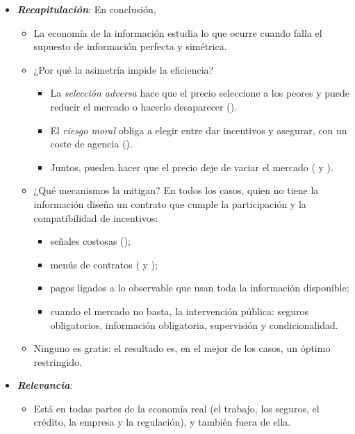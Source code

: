 \documentclass[11pt]{article}
\begin{document}
\begin{itemize}
\item \textbf{\emph{Recapitulación}}: En conclusión,
  \begin{itemize}
  \item La economía de la información estudia lo que ocurre cuando falla el supuesto de información perfecta y simétrica.
  \item ¿Por qué la asimetría impide la eficiencia?
    \begin{itemize}
    \item La \emph{selección adversa} hace que el precio seleccione a los peores y puede reducir el mercado o hacerlo desaparecer ().
    \item El \emph{riesgo moral} obliga a elegir entre dar incentivos y asegurar, con un coste de agencia ().
    \item Juntos, pueden hacer que el precio deje de vaciar el mercado ( y ).
    \end{itemize}
  \item ¿Qué mecanismos la mitigan? En todos los casos, quien no tiene la información diseña un contrato que cumple la participación y la compatibilidad de incentivos:
    \begin{itemize}
    \item señales costosas ();
    \item menús de contratos ( y );
    \item pagos ligados a lo observable que usan toda la información disponible;
    \item cuando el mercado no basta, la intervención pública: seguros obligatorios, información obligatoria, supervisión y condicionalidad.
    \end{itemize}
  \item Ninguno es gratis: el resultado es, en el mejor de los casos, un óptimo restringido.
  \end{itemize}
\item \textbf{\emph{Relevancia}}:
  \begin{itemize}
  \item Está en todas partes de la economía real (el trabajo, los seguros, el crédito, la empresa y la regulación), y también fuera de ella.


\end{itemize}
\end{itemize}
\end{document}
